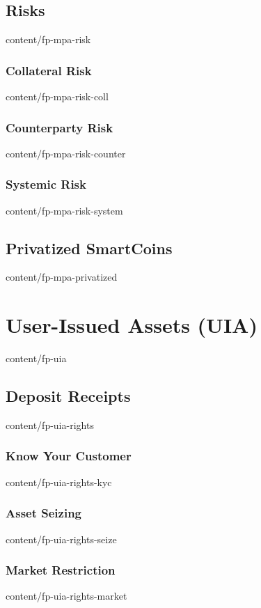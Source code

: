 \documentclass[conference,final,10pt,a4paper]{IEEEtran}
\begin{document}
\subsection     { Risks                                            }  { content/fp-mpa-risk            } 
\subsubsection  { Collateral Risk                                  }  { content/fp-mpa-risk-coll       } 
\subsubsection  { Counterparty Risk                                }  { content/fp-mpa-risk-counter    } 
\subsubsection  { Systemic Risk                                    }  { content/fp-mpa-risk-system     } 
\subsection     { Privatized SmartCoins                            }  { content/fp-mpa-privatized      } 

\section        { User-Issued Assets (UIA)                         }  { content/fp-uia                 } 
\subsection     { Deposit Receipts                                 }  { content/fp-uia-rights          } 
\subsubsection  { Know Your Customer                               }  { content/fp-uia-rights-kyc      } 
\subsubsection  { Asset Seizing                                    }  { content/fp-uia-rights-seize    } 
\subsubsection  { Market Restriction                               }  { content/fp-uia-rights-market   } 
\end{document}
